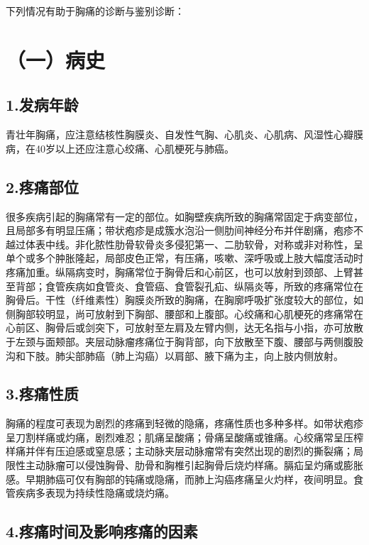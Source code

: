 下列情况有助于胸痛的诊断与鉴别诊断：

\section{（一）病史}

\subsection{1.发病年龄}

青壮年胸痛，应注意结核性胸膜炎、自发性气胸、心肌炎、心肌病、风湿性心瓣膜病，在40岁以上还应注意心绞痛、心肌梗死与肺癌。

\subsection{2.疼痛部位}

很多疾病引起的胸痛常有一定的部位。如胸壁疾病所致的胸痛常固定于病变部位，且局部多有明显压痛；带状疱疹是成簇水泡沿一侧肋间神经分布并伴剧痛，疱疹不越过体表中线。非化脓性肋骨软骨炎多侵犯第一、二肋软骨，对称或非对称性，呈单个或多个肿胀隆起，局部皮色正常，有压痛，咳嗽、深呼吸或上肢大幅度活动时疼痛加重。纵隔病变时，胸痛常位于胸骨后和心前区，也可以放射到颈部、上臂甚至背部；食管疾病如食管炎、食管癌、食管裂孔疝、纵隔炎等，所致的疼痛常位在胸骨后。干性（纤维素性）胸膜炎所致的胸痛，在胸廓呼吸扩张度较大的部位，如侧胸部较明显，尚可放射到下胸部、腰部和上腹部。心绞痛和心肌梗死的疼痛常在心前区、胸骨后或剑突下，可放射至左肩及左臂内侧，达无名指与小指，亦可放散于左颈与面颊部。夹层动脉瘤疼痛位于胸背部，向下放散至下腹、腰部与两侧腹股沟和下肢。肺尖部肺癌（肺上沟癌）以肩部、腋下痛为主，向上肢内侧放射。

\subsection{3.疼痛性质}

胸痛的程度可表现为剧烈的疼痛到轻微的隐痛，疼痛性质也多种多样。如带状疱疹呈刀割样痛或灼痛，剧烈难忍；肌痛呈酸痛；骨痛呈酸痛或锥痛。心绞痛常呈压榨样痛并伴有压迫感或窒息感；主动脉夹层动脉瘤常有突然出现的剧烈的撕裂痛；局限性主动脉瘤可以侵蚀胸骨、肋骨和胸椎引起胸骨后烧灼样痛。膈疝呈灼痛或膨胀感。早期肺癌可仅有胸部的钝痛或隐痛，而肺上沟癌疼痛呈火灼样，夜间明显。食管疾病多表现为持续性隐痛或烧灼痛。

\subsection{4.疼痛时间及影响疼痛的因素}

